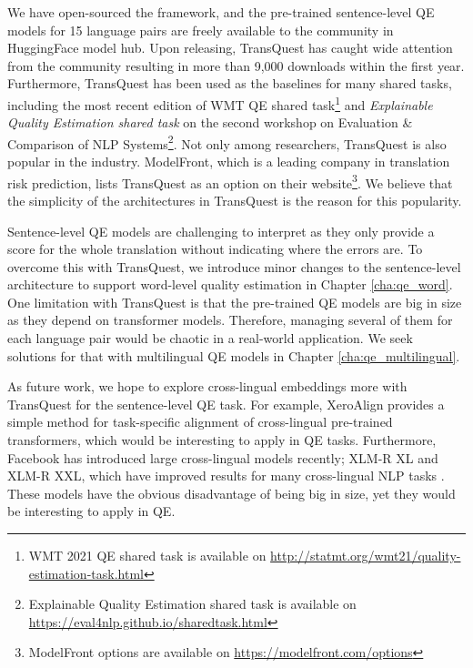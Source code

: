 We have open-sourced the framework, and the pre-trained sentence-level QE models for 15 language pairs are freely available to the community in HuggingFace model hub. Upon releasing, TransQuest has caught wide attention from the community resulting in more than 9,000 downloads within the first year. Furthermore, TransQuest has been used as the baselines for many shared tasks, including the most recent edition of WMT QE shared task\footnote{WMT 2021 QE shared task is available on \url{http://statmt.org/wmt21/quality-estimation-task.html}} and \textit{Explainable Quality Estimation shared task} on the second workshop on Evaluation \& Comparison of NLP Systems\footnote{Explainable Quality Estimation shared task is available on \url{https://eval4nlp.github.io/sharedtask.html}}. Not only among researchers, TransQuest is also popular in the industry. ModelFront, which is a leading company in translation risk prediction, lists TransQuest as an option on their website\footnote{ModelFront options are available on \url{https://modelfront.com/options}}. We believe that the simplicity of the architectures in TransQuest is the reason for this popularity. 

Sentence-level QE models are challenging to interpret as they only provide a score for the whole translation without indicating where the errors are. To overcome this with TransQuest, we introduce minor changes to the sentence-level architecture to support word-level quality estimation in Chapter \ref{cha:qe_word}. One limitation with TransQuest is that the pre-trained QE models are big in size as they depend on transformer models. Therefore, managing several of them for each language pair would be chaotic in a real-world application. We seek solutions for that with multilingual QE models in Chapter \ref{cha:qe_multilingual}.

As future work, we hope to explore cross-lingual embeddings more with TransQuest for the sentence-level QE task. For example, XeroAlign \autocite{gritta-iacobacci-2021-xeroalign} provides a simple method for task-specific alignment of cross-lingual pre-trained transformers, which would be interesting to apply in QE tasks. Furthermore, Facebook has introduced large cross-lingual models recently; XLM-R XL and XLM-R XXL, which have improved results for many cross-lingual NLP tasks \autocite{goyal2021}. These models have the obvious disadvantage of being big in size, yet they would be interesting to apply in QE. 









